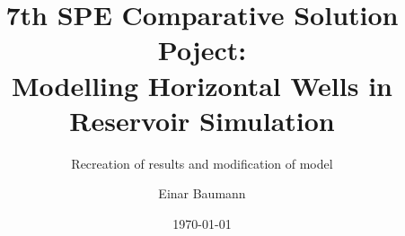 

\title[SPE CSP7]
{ %
	7th SPE Comparative Solution Poject: \\
	Modelling Horizontal Wells in Reservoir Simulation
}
 
\subtitle{Recreation of results and modification of model}
 
\author[Baumann, Einar] %
{Einar Baumann}
 
 
\date[\today] %
{\today}
 
